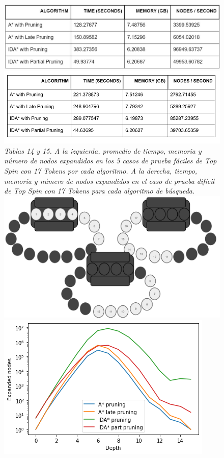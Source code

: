 \documentclass[a4paper,10pt]{article}
\begin{document}
    \begin{figure}[t!]
      \centering
      \includegraphics[scale=0.32]{topspin17T/17ts_tabla_prom.jpg}
      \includegraphics[scale=0.3]{topspin17T/tabla.png}\\
      \textit{\small{Tablas 14 y 15. A la izquierda, promedio de tiempo, 
      memoria y n\'umero de nodos expandidos en los 5 casos de prueba
      f\'aciles de Top Spin con 17 Tokens por cada algoritmo. A la 
      derecha, tiempo, memoria y n\'umero de nodos expandidos en el caso de 
      prueba dif\'icil de Top Spin con 17 Tokens para cada algoritmo de 
      b\'usqueda.}}\\
      \includegraphics[scale=0.2]{topspin17T/pdb.png}
      \includegraphics[scale=0.4]{topspin17T/topspin17.png} \\

\end{figure}
\end{document}
